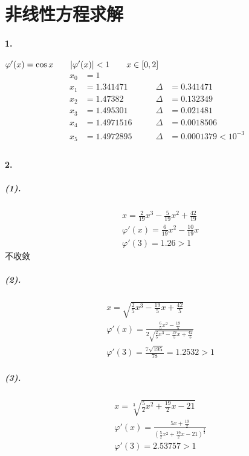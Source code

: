 \documentclass[UTF8]{ctexart}
\begin{document}
	\section{非线性方程求解}
	\paragraph{1.}
		$\varphi ' (x)=\cos x\qquad |\varphi ' (x)|< 1 \qquad x\in [0, 2]\\$
		\begin{displaymath}
		\begin{aligned}
			x_0&=1&&\\
			x_1&=1.341471\qquad &\Delta&=0.341471\\
			x_2&=1.47382\qquad  &\Delta&=0.132349\\
			x_3&=1.495301\qquad &\Delta&=0.021481\\
			x_4&=1.4971516\qquad&\Delta&=0.0018506\\
			x_5&=1.4972895\qquad&\Delta&=0.0001379<10^{-3}\\
		\end{aligned}
		\end{displaymath}
	
	\paragraph{2.}
		\subparagraph{(1).}
		\begin{displaymath}
			\begin{aligned}
			&x=\frac{2}{19}x^3-\frac{5}{19}x^2+\frac{42}{19}\\
			&\varphi'(x)=\frac{6}{19}x^2-\frac{10}{19}x\\
			&\varphi'(3)=1.26>1
			\end{aligned}
		\end{displaymath}
		\qquad\qquad\qquad 不收敛
				
		\subparagraph{(2).}
		\begin{displaymath}
			\begin{aligned}
			&x=\sqrt{\frac{2}{5}x^3-\frac{19}{5}x+\frac{42}{5}}\\
			&\varphi'(x)=\frac{\frac{6}{5}x^2-\frac{19}{5}}{2\sqrt{\frac{2}{5}x^3-\frac{19}{5}x+\frac{42}{5}}}\\
			&\varphi'(3)=\frac{7\sqrt{195}}{78}=1.2532>1				
			\end{aligned}
		\end{displaymath}
	
		\subparagraph{(3).}
		\begin{displaymath}
			\begin{aligned}
			&x=\sqrt[3]{\frac{5}{2}x^2+\frac{19}{2}x-21}\\
			&\varphi'(x)=\frac{5x+\frac{19}{2}}{(\frac{5}{2}x^2+\frac{19}{2}x-21)^{\frac{2}{3}}}\\
			&\varphi'(3)=2.53757>1
			\end{aligned}
		\end{displaymath}
	
\end{document}
